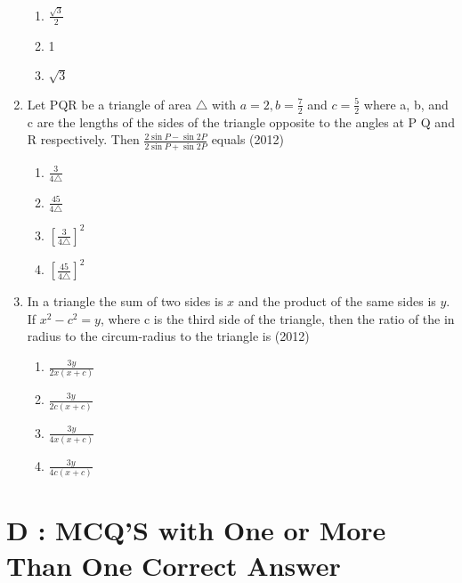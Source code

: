 \documentclass[12pt]{article}
\providecommand{\sbrak}[1]{\ensuremath{{}\left[#1\right]}}
\begin{document}
\begin{enumerate}
\begin{enumerate}
\item $\frac{\sqrt{3}}{2}$
\item 1
\item $\sqrt{3}$
\end{enumerate}
\item Let PQR be a triangle of area $\triangle$ with $a=2,b=\frac{7}{2}$ and $c=\frac{5}{2}$ where a, b, and c are the lengths of the sides of the triangle opposite to the angles at P Q and R respectively. Then $\frac{2\sin P-\sin 2P}{2\sin P+\sin 2P}$ equals (2012)
\begin{enumerate}
\item $\frac{3}{4\triangle}$
\item $\frac{45}{4\triangle}$
\item $\sbrak{\frac{3}{4\triangle}}^2$
\item $\sbrak{\frac{45}{4\triangle}}^2$
\end{enumerate}
\item In a triangle the sum of two sides is $x$ and the product of the same sides is $y$. If $x^2-c^2=y$, where c is the third side of the triangle, then the ratio of the in radius to the circum-radius to the triangle is (2012)
\begin{enumerate}
\item  $\frac{3y}{2x(x+c)}$
\item  $\frac{3y}{2c(x+c)}$
\item  $\frac{3y}{4x(x+c)}$
\item  $\frac{3y}{4c(x+c)}$
\end{enumerate}
\end{enumerate}


\section*{D  :  MCQ'S with One or More Than One Correct Answer}
\end{document}
